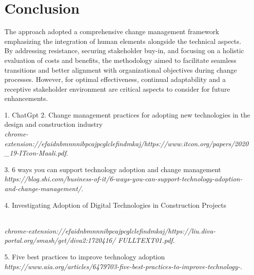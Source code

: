 \documentclass[11pt,letterpaper]{report}
\begin{document}
\section{Conclusion}
The approach adopted a comprehensive change management framework emphasizing the integration of human elements alongside the technical aspects. By addressing resistance, securing stakeholder buy-in, and focusing on a holistic evaluation of costs and benefits, the methodology aimed to facilitate seamless transitions and better alignment with organizational objectives during change processes. However, for optimal effectiveness, continual adaptability and a receptive stakeholder environment are critical aspects to consider for future enhancements.


\begin{thebibliography}{5}

         1. ChatGpt
        \textit{}   
        \vspace{0.5cm}
         2. Change management practices for adopting new technologies in the design and construction industry 
         \\\textit{chrome-extension://efaidnbmnnnibpcajpcglclefindmkaj/https://www.itcon.org/papers/2020_19-ITcon-Maali.pdf}. 
         \vspace{0.5cm}

        3. 6 ways you can support technology adoption and change management 
        \\\textit{https://blog.shi.com/business-of-it/6-ways-you-can-support-technology-adoption-and-change-management/}. 
        \vspace{0.5cm}
        
        4. Investigating Adoption  of Digital Technologies  in Construction Projects
        
    \\\textit{chrome-extension://efaidnbmnnnibpcajpcglclefindmkaj/https://liu.diva-portal.org/smash/get/diva2:1720416/
    FULLTEXT01.pdf}.
        \vspace{0.5cm}

        5. Five best practices to improve technology adoption  \\\textit{https://www.aia.org/articles/6479703-five-best-practices-to-improve-technology-}. 
        \vspace{0.5cm}


\end{thebibliography}
\end{document}
